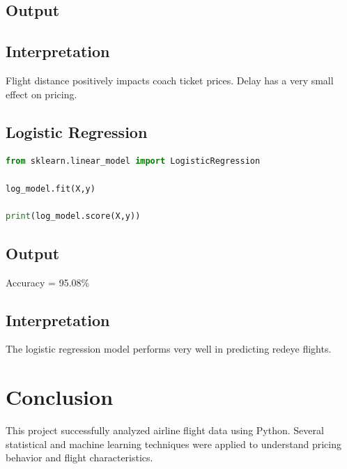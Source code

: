 \documentclass[12pt,a4paper]{article}
\begin{document}
\subsection{Output}

\begin{tcolorbox}[colback=lightblue]
[0.02785972, -0.90216435, 0.02711225]
\end{tcolorbox}

\subsection{Interpretation}

Flight distance positively impacts coach ticket prices. Delay has a very small effect on pricing.

\subsection{Logistic Regression}

\begin{lstlisting}[language=Python]
from sklearn.linear_model import LogisticRegression

log_model.fit(X,y)

print(log_model.score(X,y))
\end{lstlisting}

\subsection{Output}

\begin{tcolorbox}[colback=lightblue]
Accuracy = 95.08\%
\end{tcolorbox}

\subsection{Interpretation}

The logistic regression model performs very well in predicting redeye flights.

\section{Conclusion}

This project successfully analyzed airline flight data using Python. Several statistical and machine learning techniques were applied to understand pricing behavior and flight characteristics.
\end{document}

